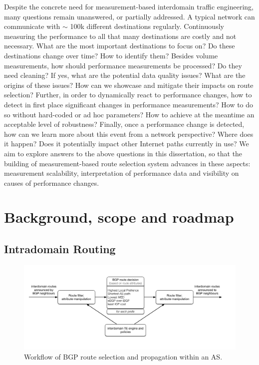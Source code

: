 Despite the concrete need for measurement-based interdomain traffic engineering, many questions remain unanswered, or partially addressed.
A typical network can communicate with $\sim$ 100k different destinations regularly. 
Continuously measuring the performance to all that many destinations are costly and not necessary. 
What are the most important destinations to focus on? Do these destinations change over time? How to identify them?
Besides volume measurements, how should performance measurements be processed? Do they need cleaning?
If yes, what are the potential data quality issues? What are the origins of these issues? How can we showcase and mitigate their impacts on route selection?
Further, in order to dynamically react to performance changes, how to detect in first place significant changes in performance measurements? How to do so without hard-coded or ad hoc parameters? How to achieve at the meantime an acceptable level of robustness?
Finally, once a performance change is detected, how can we learn more about this event from a network perspective? Where does it happen? Does it potentially impact other Internet paths currently in use? 
We aim to explore answers to the above questions in this dissertation, so that the building of measurement-based route selection system advances in these aspects: measurement scalability, interpretation of performance data and visibility on causes of performance changes. 

\chapter{Background, scope and roadmap}
\section{Intradomain Routing}
\begin{figure}[!htb]
\centering
\includegraphics[width=1.3\textwidth]{gfx/chap1/bgp_decision.pdf}
\caption{Workflow of \acf{BGP} route selection and propagation within an \acf{AS}.}
\label{fig:bgp_decision}
\end{figure}

